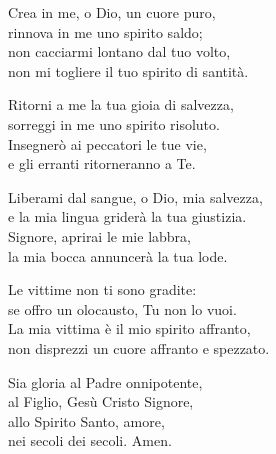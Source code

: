 \spazio

\strofa Crea in me, o Dio, un cuore puro,\\
rinnova in me uno spirito saldo;\\
non cacciarmi lontano dal tuo volto,\\
non mi togliere il tuo spirito di santità.

\spazio


\spazio

\strofa Ritorni a me la tua gioia di salvezza,\\
sorreggi in me uno spirito risoluto.\\
Insegnerò ai peccatori le tue vie,\\
e gli erranti ritorneranno a Te.

\spazio


\spazio

\strofa Liberami dal sangue, o Dio, mia salvezza,\\
e la mia lingua griderà la tua giustizia.\\
Signore, aprirai le mie labbra,\\
la mia bocca annuncerà la tua lode.

\spazio


\spazio

\strofa Le vittime non ti sono gradite:\\
se offro un olocausto, Tu non lo vuoi.\\
La mia vittima è il mio spirito affranto,\\
non disprezzi un cuore affranto e spezzato.

\spazio


\spazio

\strofa Sia gloria al Padre onnipotente,\\
al Figlio, Gesù Cristo Signore,\\
allo Spirito Santo, amore,\\
nei secoli dei secoli. Amen.

\spazio

